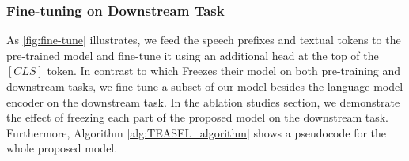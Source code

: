 \documentclass[letterpaper]{article} \usepackage{spconf,amsmath,graphicx}
\begin{document}
\subsubsection{Fine-tuning on Downstream Task}
As \autoref{fig:fine-tune} illustrates, we feed the speech prefixes and textual tokens to the pre-trained model and fine-tune it using an additional head at the top of the $[CLS]$ token. In contrast to \cite{tsimpoukelli2021multimodal} which Freezes their model on both pre-training and downstream tasks, we fine-tune a subset of our model besides the language model encoder on the downstream task. In the ablation studies section, we demonstrate the effect of freezing each part of the proposed model on the downstream task.  Furthermore, Algorithm \ref{alg:TEASEL_algorithm} shows a pseudocode for the whole proposed model. 
\end{document}
